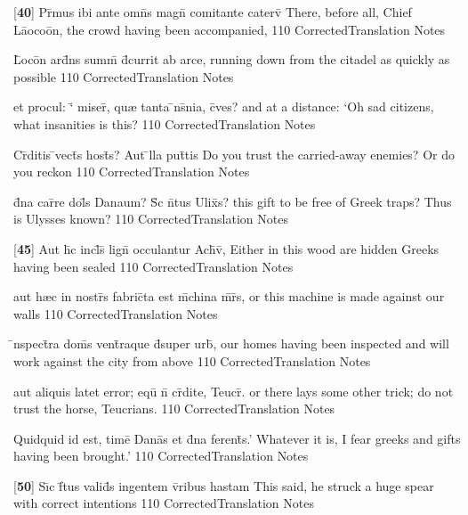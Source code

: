 \latline
  {[\textbf{40}] Pr\={\macron {\i}}mus ibi ante omn\={\macron {\i}}s magn\={} comitante caterv\={}}
  { There, before all, Chief L\={a}oco\={o}n, the crowd having been accompanied, }
  {110}
  { CorrectedTranslation }
  { Notes }


\latline
  {L\={}oco\={}n ard\={}ns summ\={} d\={}currit ab arce,}
  { running down from the citadel as quickly as possible   }
  {110}
  { CorrectedTranslation }
  { Notes }


\latline
  {et procul: `\={} miser\={\macron {\i}}, qu{\ae} tanta \={\macron {\i}}ns\={}nia, c\={\macron {\i}}ves?  }
  { and at a distance:  `Oh sad citizens, what insanities is this? }
  {110}
  { CorrectedTranslation }
  { Notes }


\latline
  {Cr\={}ditis \={}vect\={}s host\={\macron {\i}}s?  Aut \={}lla put\={}tis}
  { Do you trust the carried-away enemies?  Or do you reckon }
  {110}
  { CorrectedTranslation }
  { Notes }


\latline
  {d\={}na car\={}re dol\={\macron {\i}}s Danaum?  S\={\macron {\i}}c n\={}tus Ulix\={}s?}
  { this gift to be free of Greek traps?  Thus is Ulysses known? }
  {110}
  { CorrectedTranslation }
  { Notes }


\latline
  {[\textbf{45}] Aut h\={}c incl\={}s\={\macron {\i}} lign\={} occulantur Ach\={\macron {\i}}v\={\macron {\i}},}
  { Either in this wood are hidden Greeks having been sealed }
  {110}
  { CorrectedTranslation }
  { Notes }


\latline
  {aut h{\ae}c in nostr\={}s fabric\={}ta est m\={}china m\={}r\={}s,}
  { or this machine is made against our walls }
  {110}
  { CorrectedTranslation }
  { Notes }


\latline
  {\={\macron {\i}}nspect\={}ra dom\={}s vent\={}raque d\={}super urb\={\macron {\i}},}
  { our homes having been inspected and will work against the city from above }
  {110}
  { CorrectedTranslation }
  { Notes }


\latline
  {aut aliquis latet error; equ\={} n\={} cr\={}dite, Teucr\={\macron {\i}}.}
  { or there lays some other trick; do not trust the horse, Teucrians. }
  {110}
  { CorrectedTranslation }
  { Notes }


\latline
  {Quidquid id est, time\={} Dana\={}s et d\={}na ferent\={\macron {\i}}s.'}
  { Whatever it is, I fear greeks and gifts having been brought.' }
  {110}
  { CorrectedTranslation }
  { Notes }


\latline
  {[\textbf{50}] S\={\i}c f\={}tus valid\={\macron {\i}}s ingentem v\={\macron {\i}}ribus hastam}
  { This said, he struck a huge spear with correct intentions }
  {110}
  { CorrectedTranslation }
  { Notes }


